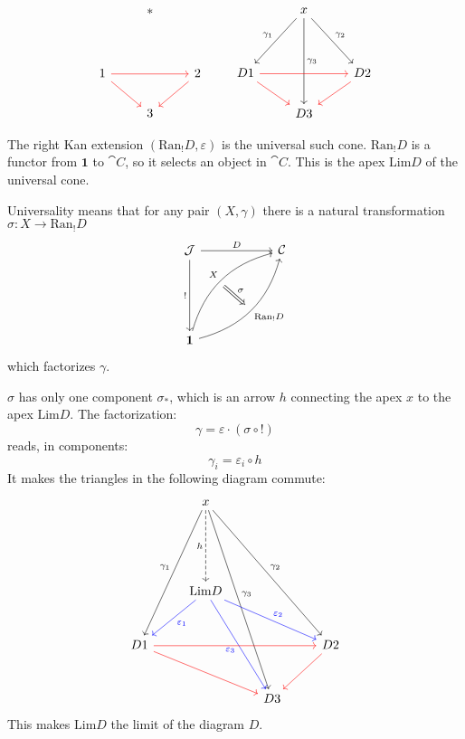 \documentclass[DaoFP]{subfiles}
\begin{document}
\[
 \begin{tikzcd}
  & *
 \\
\\
1 
\arrow[rr, red]
\arrow[rd, red]
&& 2
\arrow[dl, red]
\\
& 3
 \end{tikzcd}
 \qquad
 \begin{tikzcd}
  & x
\arrow[ddr, "\gamma_2"]
 \arrow[ddl, "\gamma_1"']
 \arrow[ddd, "\gamma_3"]
 \\
\\
D 1 
\arrow[rr, red]
\arrow[rd, red]
&& D 2
\arrow[dl, red]
\\
& D 3
 \end{tikzcd}
 \]



The right Kan extension $(\text{Ran}_! D, \varepsilon)$ is the universal such cone. $\text{Ran}_! D$ is a functor from $\mathbf 1$ to $\cat C$, so it selects an object in $\cat C$. This is the apex $\text{Lim} D$ of the universal cone. 

Universality means that for any pair $(X, \gamma)$ there is a natural transformation $\sigma \colon X \to \text{Ran}_! D$ 
\[
\begin{tikzcd}[row sep=2cm, column sep=2cm]
\cat J  \ar[d, "!"', "" {name=P}]
            \ar[r, "D", ""  {name=F, below, near start, bend right}]
&
\cat C
\\
\mathbf 1
    \ar[ur, bend left, "X", "" {name=G, below}]
    \ar[ur, bend right, "\text{Ran}_! D"', "" {name=Ran}]
\arrow[Rightarrow, "\sigma", from=G, to=Ran]
\end{tikzcd}
\]
which factorizes $\gamma$. 

$\sigma$ has only one component $\sigma_*$, which is an arrow $h$ connecting the apex $x$ to the apex $\text{Lim} D$. The factorization:
 \[ \gamma = \varepsilon \cdot (\sigma \circ !) \]
reads, in components:
\[ \gamma_i = \varepsilon_i \circ h \]
It makes the triangles in the following diagram commute:
\[
 \begin{tikzcd}[row sep=1cm]
  & x
\arrow[dddl, "\gamma_1"']
\arrow[ddddr, "\gamma_3"]
\arrow[dddrr, "\gamma_2"]
\arrow[dd, dashed, "h"']
 \\
 \\
 & \text{Lim} D
\arrow[dl, blue, "\varepsilon_1"]
\arrow[ddr, blue, "\varepsilon_3"']
\arrow[drr, blue, "\varepsilon_2"]
\\
D 1 
\arrow[rrr, red]
\arrow[rrd, red]
&&& D 2
\arrow[dl, red]
\\
&& D 3
 \end{tikzcd}
 \]
This makes $\text{Lim} D$ the limit of the diagram $D$.
\end{document}
